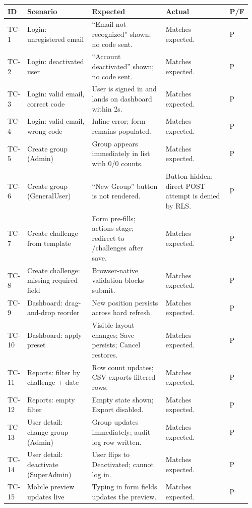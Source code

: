 \documentclass[11pt,letterpaper]{article}
\begin{document}
\begin{longtable}{p{0.06\linewidth} p{0.27\linewidth} p{0.31\linewidth} p{0.27\linewidth} p{0.05\linewidth}}
\toprule
\textbf{ID} & \textbf{Scenario} & \textbf{Expected} & \textbf{Actual} & \textbf{P/F} \\
\midrule
TC-1 & Login: unregistered email & ``Email not recognized'' shown; no code sent. & Matches expected. & P \\
TC-2 & Login: deactivated user & ``Account deactivated'' shown; no code sent. & Matches expected. & P \\
TC-3 & Login: valid email, correct code & User is signed in and lands on dashboard within 2s. & Matches expected. & P \\
TC-4 & Login: valid email, wrong code & Inline error; form remains populated. & Matches expected. & P \\
TC-5 & Create group (Admin) & Group appears immediately in list with 0/0 counts. & Matches expected. & P \\
TC-6 & Create group (GeneralUser) & ``New Group'' button is not rendered. & Button hidden; direct POST attempt is denied by RLS. & P \\
TC-7 & Create challenge from template & Form pre-fills; actions stage; redirect to /challenges after save. & Matches expected. & P \\
TC-8 & Create challenge: missing required field & Browser-native validation blocks submit. & Matches expected. & P \\
TC-9 & Dashboard: drag-and-drop reorder & New position persists across hard refresh. & Matches expected. & P \\
TC-10 & Dashboard: apply preset & Visible layout changes; Save persists; Cancel restores. & Matches expected. & P \\
TC-11 & Reports: filter by challenge + date & Row count updates; CSV exports filtered rows. & Matches expected. & P \\
TC-12 & Reports: empty filter & Empty state shown; Export disabled. & Matches expected. & P \\
TC-13 & User detail: change group (Admin) & Group updates immediately; audit log row written. & Matches expected. & P \\
TC-14 & User detail: deactivate (SuperAdmin) & User flips to Deactivated; cannot log in. & Matches expected. & P \\
TC-15 & Mobile preview updates live & Typing in form fields updates the preview. & Matches expected. & P \\
\bottomrule
\end{longtable}
\end{document}
